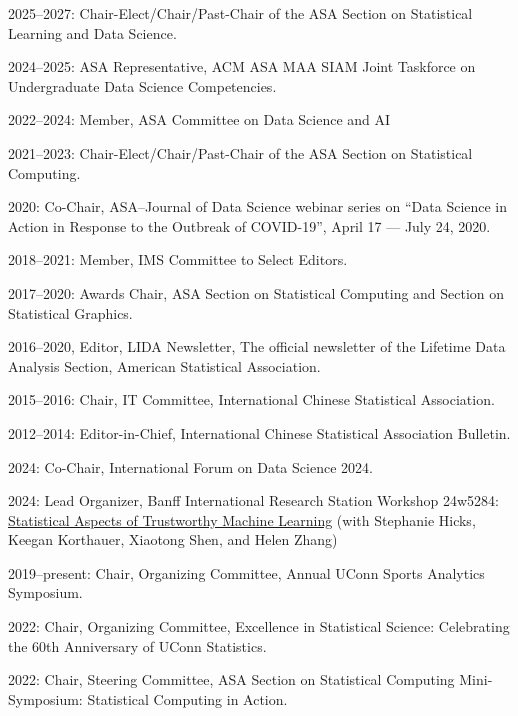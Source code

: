 \documentclass[Statistics]{vita}
\begin{document}
\begin{vita}
\begin{Services}
\begin{Editorial}
  \end{Editorial}
  \begin{SocietyService}
  \item 2025--2027: Chair-Elect/Chair/Past-Chair of the ASA Section on Statistical Learning and Data Science.
  \item 2024--2025: ASA Representative, ACM ASA MAA SIAM Joint Taskforce on Undergraduate Data Science Competencies.
  \item 2022--2024: Member, ASA Committee on Data Science and AI
  \item 2021--2023: Chair-Elect/Chair/Past-Chair of the ASA Section on Statistical Computing.
  \item 2020: Co-Chair, ASA--Journal of Data Science webinar series on ``Data Science in Action in Response to the Outbreak of COVID-19'', April 17 --- July 24, 2020.
  \item 2018--2021: Member, IMS Committee to Select Editors.
  \item 2017--2020: Awards Chair, ASA Section on Statistical Computing and Section on Statistical Graphics.
  \item 2016--2020, Editor, LIDA Newsletter, The official newsletter of the Lifetime Data Analysis Section, American Statistical Association.
  \item 2015--2016: Chair, IT Committee, International Chinese Statistical Association.
  \item 2012--2014: Editor-in-Chief, International Chinese Statistical Association Bulletin.
  \end{SocietyService}
  \begin{Conferences}
  \item 2024: Co-Chair, International Forum on Data Science 2024.
  \item 2024: Lead Organizer, Banff International Research Station Workshop 24w5284: \href{http://www.birs.ca/event/24w5284}{Statistical Aspects of Trustworthy Machine Learning} (with Stephanie Hicks, Keegan Korthauer, Xiaotong Shen, and Helen Zhang)
  \item 2019--present: Chair, Organizing Committee, Annual UConn Sports Analytics Symposium.
  \item 2022: Chair, Organizing Committee, Excellence in Statistical Science: Celebrating the 60th Anniversary of UConn Statistics.
  \item 2022: Chair, Steering Committee, ASA Section on Statistical Computing Mini-Symposium: Statistical Computing in Action.

\end{Conferences}
\end{Services}
\end{vita}
\end{document}

